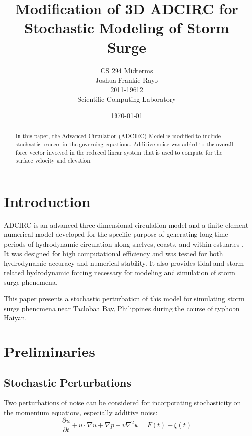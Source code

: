 \documentclass[a4paper, 11pt]{article}
\title{Modification of 3D ADCIRC for \\Stochastic Modeling of Storm Surge}
\author{CS 294 Midterms\\ Joshua Frankie Rayo\\ 2011-19612\\ Scientific Computing Laboratory}
\date{\today}
\begin{document}
\maketitle

\begin{abstract}
	In this paper, the Advanced Circulation (ADCIRC) Model is modified to include stochastic process in the governing equations. Additive noise was added to the overall force vector involved in the reduced linear system that is used to compute for the surface velocity and elevation.
\end{abstract}

\tableofcontents

\section{Introduction}
ADCIRC is an advanced three-dimensional circulation model and a finite element numerical model developed for the specific purpose of generating long time periods of hydrodynamic circulation along shelves, coasts, and within estuaries \cite{bib:adcirc}. It was designed for high computational efficiency and was tested for both hydrodynamic accuracy and numerical stability. It also provides tidal and storm related hydrodynamic forcing necessary for modeling and simulation of storm surge phenomena.

This paper presents a stochastic perturbation of this model for simulating storm surge phenomena near Tacloban Bay, Philippines during the course of typhoon Haiyan.

\section{Preliminaries}
\subsection{Stochastic Perturbations}
Two perturbations of noise can be considered for incorporating stochasticity on the momentum equations, especially additive noise:
	\begin{equation*}
	\frac{\partial u}{\partial t} + u \cdot \nabla u + \nabla p - v \nabla^2 u = F(t) + \xi(t)
	\end{equation*}
\end{document}

